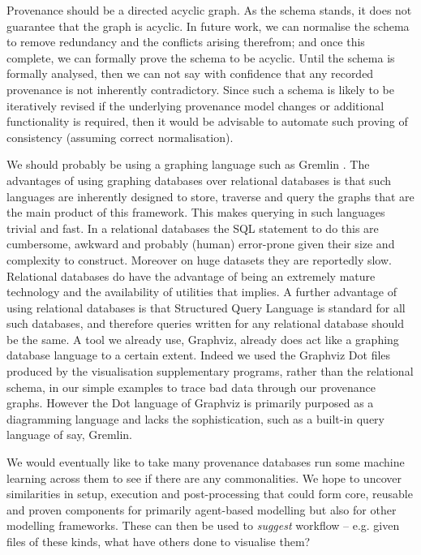 \documentclass[runningheads]{llncs}
\begin{document}
Provenance should be a directed acyclic graph. As the schema stands, it does not
guarantee that the graph is acyclic. In future work, we can  normalise the
schema to remove redundancy and the conflicts arising therefrom;
and once this complete, we can formally prove the schema to be acyclic. 
Until the schema is formally analysed, then we can not say with confidence that
any recorded provenance is not inherently contradictory. Since such a schema is likely to be
iteratively revised if the underlying provenance model changes or additional
functionality is required, then it would be advisable to automate such proving
of consistency (assuming correct normalisation). 

We should probably be using a graphing language such as Gremlin \cite{rodriguez2015gremlin}. The
advantages of using graphing databases over relational databases is that such
languages are inherently designed to store, traverse and query the graphs that
are the main product of this framework. This makes querying in such languages
trivial and fast. In a relational databases the SQL statement to do this are
cumbersome, awkward and probably (human) error-prone given their size and complexity to construct. Moreover on huge
datasets they are reportedly slow. Relational databases do have the advantage
of being an extremely mature technology and the availability of utilities that
implies. A further advantage of using relational databases is that
Structured Query Language is standard for all such databases, and therefore
queries written for any relational database should be the same. A tool we
already use, Graphviz, already does act like a graphing database language to a
certain extent. Indeed we used the Graphviz Dot files produced by the visualisation supplementary programs, rather than the
relational schema, in our simple examples to trace bad data through our
provenance graphs.  However the Dot language of Graphviz is primarily
purposed as a diagramming language and lacks the sophistication, such as a
built-in query language of say, Gremlin.

We would eventually like to take many provenance databases run some machine learning across them to see if there are any commonalities. We hope to uncover similarities in setup, execution and post-processing that could form core, reusable and proven components for primarily agent-based modelling but also for other modelling frameworks. These can then be used to \textit{suggest} workflow -- e.g. given files of these kinds, what have others done to visualise them?
\end{document}
